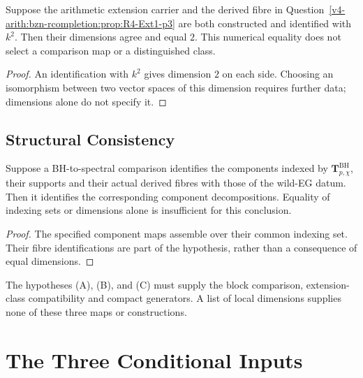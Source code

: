 \begin{proposition}[conditional dimensional comparison at \(p=3\)]
\label{v4-arith:f1a3-BH:prop:dim-comparison-p3}
Suppose the arithmetic extension carrier and the derived fibre
in Question~\ref{v4-arith:bzn-rcompletion:prop:R4-Ext1-p3}
are both constructed and identified with \(k^{2}\).
Then their dimensions agree and equal \(2\). This numerical equality
does not select a comparison map or a distinguished class.
\end{proposition}
\begin{proof}
An identification with \(k^{2}\) gives dimension \(2\) on each
side. Choosing an isomorphism between two vector spaces of this
dimension requires further data; dimensions alone do not specify it.
\end{proof}

\subsection{Structural Consistency}

\begin{proposition}
\label{v4-arith:f1a3-BH:prop:structural-consistency}
Suppose a BH-to-spectral comparison identifies the components indexed
by \(\mathbf T^{\mathrm{BH}}_{p,\chi}\), their supports and their
actual derived fibres with those of the wild-EG datum. Then it
identifies the corresponding component decompositions. Equality of
indexing sets or dimensions alone is insufficient for this conclusion.
\end{proposition}
\begin{proof}
The specified component maps assemble over their common indexing
set. Their fibre identifications are part of the hypothesis, rather
than a consequence of equal dimensions.
\end{proof}
\begin{remark}
\label{v4-arith:f1a3-BH:rem:no-new-structure}
The hypotheses (A), (B), and (C) must supply the block comparison,
extension-class compatibility and compact generators. A list of
local dimensions supplies none of these three maps or constructions.
\end{remark}

\section{The Three Conditional Inputs}
\label{v4-arith:f1a3-BH:conjectures}

